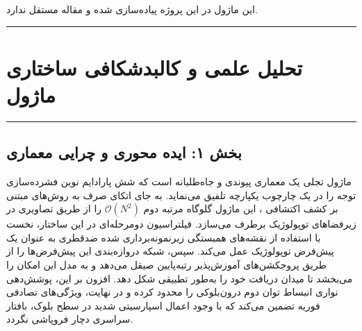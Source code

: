 \clearpage
{}
\vspace*{0.2cm}

این ماژول در این پروژه پیاده‌سازی شده و مقاله مستقل ندارد.
\noindent\rule{\textwidth}{1.2pt}
\vspace*{0.1cm}
\section{تحلیل علمی و کالبدشکافی ساختاری ماژول }
\label{sec:mod_nexus}
\vspace*{-0.2cm}
\noindent\rule{\textwidth}{0.5pt}
\vspace*{0.3cm}

\subsection*{بخش ۱: ایده محوری و چرایی معماری }
ماژول  تجلی یک معماری پیوندی  و جاه‌طلبانه است که شش پارادایم نوین فشرده‌سازی توجه را در یک چارچوب یکپارچه تلفیق می‌نماید. به جای اتکای صرف به روش‌های مبتنی بر کشف اکتشافی ، این ماژول گلوگاه مرتبه دوم $\mathcal{O}(N^2)$ را از طریق تصاویری در زیرفضاهای توپولوژیک برطرف می‌سازد. فیلتراسیون دومرحله‌ای در این ساختار، نخست با استفاده از نقشه‌های همبستگی زیرنمونه‌برداری شده ضدقطری  به عنوان یک پیش‌فرض توپولوژیک عمل می‌کند. سپس، شبکه دروازه‌بندی  این پیش‌فرض‌ها را از طریق پروجکشن‌های آموزش‌پذیر رتبه‌پایین صیقل می‌دهد و به مدل این امکان را می‌بخشد تا میدان دریافت  خود را به‌طور تطبیقی شکل دهد. افزون بر این، پوشش‌دهی نواری  انبساط توان دوم درون‌بلوکی را محدود کرده و در نهایت، ویژگی‌های تصادفی فوریه  تضمین می‌کند که با وجود اعمال اسپارسیتی شدید در سطح بلوک، بافتار سراسری  دچار فروپاشی نگردد.

